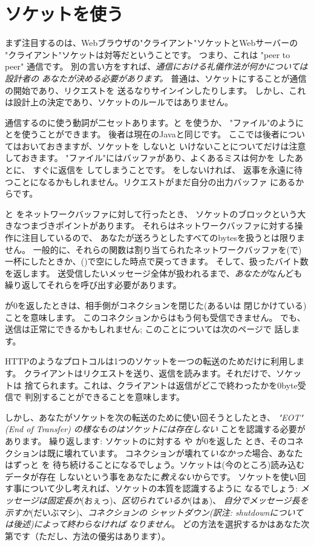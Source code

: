 \documentclass{howto}
\begin{document}
\section{ソケットを使う}

まず注目するのは、Webブラウザの"クライアント"ソケットとWebサーバーの
"クライアント"ソケットは対等だということです。
つまり、これは "peer to peer" 通信です。
別の言い方をすれば、\emph{通信における礼儀作法が何かについては設計者の
あなたが決める必要があります。}
普通は、ソケットにすることが通信の開始であり、リクエストを
送るなりサインインしたりします。
しかし、これは設計上の決定であり、ソケットのルールではありません。

通信するのに使う動詞が二セットあります。と を使うか、
"ファイル"のようにとを使うことができます。
後者は現在のJavaと同じです。
ここでは後者についてはおいておきますが、ソケットを  しないと
いけないことについてだけは注意しておきます。
"ファイル"にはバッファがあり、よくあるミスは何かを  したあとに、
すぐに返信を  してしまうことです。 をしないければ、
返事を永遠に待つことになるかもしれません。リクエストがまだ自分の出力バッファ
にあるからです。

 と  をネットワークバッファに対して行ったとき、
ソケットのブロックという大きなつまづきポイントがあります。
それらはネットワークバッファに対する操作に注目しているので、
あなたが送ろうとしたすべてのbytesを扱うとは限りません。
一般的に、それらの関数は割り当てられたネットワークバッファを(で)
一杯にしたときか、()で空にした時点で戻ってきます。
そして、扱ったバイト数を返します。
送受信したいメッセージ全体が扱われるまで、\emph{あなたが}なんども
繰り返してそれらを呼び出す必要があります。

が0を返したときは、相手側がコネクションを閉じた(あるいは
閉じかけている)ことを意味します。
このコネクションからはもう何も受信できません。
でも、送信は正常にできるかもしれません; このことについては次のページで
話します。

HTTPのようなプロトコルは1つのソケットを一つの転送のためだけに利用します。
クライアントはリクエストを送り、返信を読みます。それだけで、ソケットは
捨てられます。これは、クライアントは返信がどこで終わったかを0byte受信で
判別することができることを意味します。

しかし、あなたがソケットを次の転送のために使い回そうとしたとき、
\emph{"EOT" (End of Transfer) の様なものはソケットには存在しない}
ことを認識する必要があります。
繰り返します: ソケットのに対する  や  が0を返した
とき、そのコネクションは既に壊れています。
コネクションが壊れて\emph{いなかった}場合、あなたはずっと  を
待ち続けることになるでしょう。ソケットは(今のところ)読み込むデータが存在
しないという事をあなたに\emph{教えない}からです。
ソケットを使い回す事について少し考えれば、ソケットの本質を認識するように
なるでしょう: \emph{メッセージは固定長か}(おぇっ)、\emph{区切られているか}(はぁ)、
\emph{自分でメッセージ長を示すか}(だいぶマシ)、\emph{コネクションの
シャットダウン(訳注: shutdownについては後述)によって終わらなければ
なりません}。
どの方法を選択するかはあなた次第です（ただし、方法の優劣はあります）。
\end{document}
